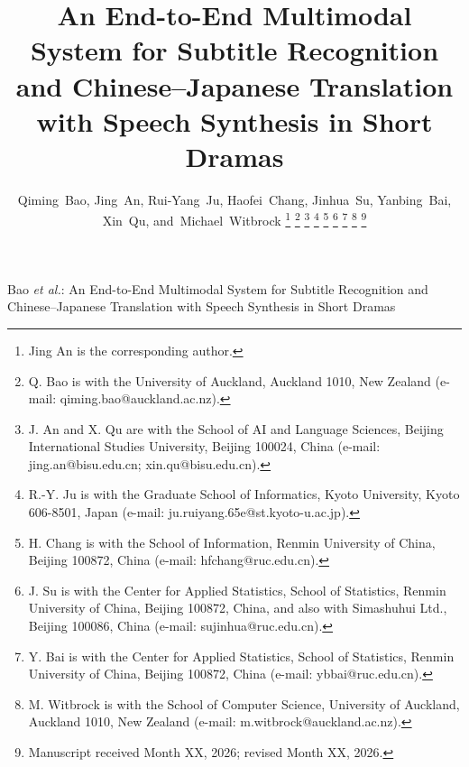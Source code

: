 \documentclass[journal]{IEEEtran}
\begin{document}
\title{An End-to-End Multimodal System for Subtitle Recognition and Chinese--Japanese Translation with Speech Synthesis in Short Dramas}

\author{Qiming~Bao,
    Jing~An,
    Rui-Yang~Ju,
    Haofei~Chang,
    Jinhua~Su,
    Yanbing~Bai,
    Xin~Qu,
    and~Michael~Witbrock%
\thanks{Jing An is the corresponding author.}%
\thanks{Q. Bao is with the University of Auckland, Auckland 1010, New Zealand (e-mail: qiming.bao@auckland.ac.nz).}%
\thanks{J. An and X. Qu are with the School of AI and Language Sciences, Beijing International Studies University, Beijing 100024, China (e-mail: jing.an@bisu.edu.cn; xin.qu@bisu.edu.cn).}%
\thanks{R.-Y. Ju is with the Graduate School of Informatics, Kyoto University, Kyoto 606-8501, Japan (e-mail: ju.ruiyang.65e@st.kyoto-u.ac.jp).}%
\thanks{H. Chang is with the School of Information, Renmin University of China, Beijing 100872, China (e-mail: hfchang@ruc.edu.cn).}%
\thanks{J. Su is with the Center for Applied Statistics, School of Statistics, Renmin University of China, Beijing 100872, China, and also with Simashuhui Ltd., Beijing 100086, China (e-mail: sujinhua@ruc.edu.cn).}%
\thanks{Y. Bai is with the Center for Applied Statistics, School of Statistics, Renmin University of China, Beijing 100872, China (e-mail: ybbai@ruc.edu.cn).}%
\thanks{M. Witbrock is with the School of Computer Science, University of Auckland, Auckland 1010, New Zealand (e-mail: m.witbrock@auckland.ac.nz).}%
\thanks{Manuscript received Month XX, 2026; revised Month XX, 2026.}}

%
{Bao \MakeLowercase{\textit{et al.}}: An End-to-End Multimodal System for Subtitle Recognition and Chinese--Japanese Translation with Speech Synthesis in Short Dramas}

\maketitle
\end{document}

